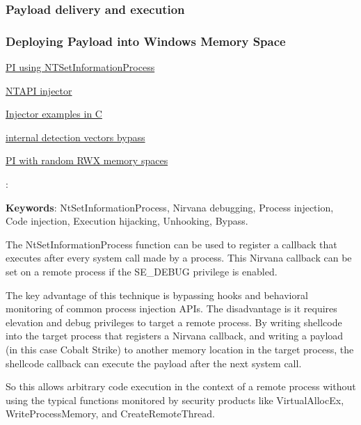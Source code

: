 \documentclass{article}
\newcommand{\outlinecite}[1]{\citetitle{#1} \textcite{#1}}
\begin{document}
\subsubsection{Payload delivery and execution}

\subsubsection{Deploying Payload into Windows Memory Space}

\outlinecite{Zhan:2018}

\href{https://www.riskinsight-wavestone.com/en/2023/10/process-injection-using-ntsetinformationprocess/}{PI using NTSetInformationProcess}

\href{https://github.com/elddy/Windows-NTAPI-Injector}{NTAPI injector} 

\href{https://gist.github.com/WKL-Sec/96e17188e4c159c2cdf7ff2c111130cc#file-local-c}{Injector examples in C}

\href{https://www.unknowncheats.me/forum/anti-cheat-bypass/286274-internal-detection-vectors-bypass.html}{internal detection vectors bypass}

\href{https://medium.com/@s12deff/process-injection-with-random-rwx-memory-spaces-3e3651149527}{PI with random RWX memory spaces}


\textbf{}: \autocite{Dequeker:2023}

\textbf{Keywords}: NtSetInformationProcess, Nirvana debugging, Process injection, Code injection, Execution hijacking, Unhooking, Bypass.

The NtSetInformationProcess function can be used to register a callback that executes after every system call made by a process. This Nirvana callback can be set on a remote process if the SE\_DEBUG privilege is enabled.

The key advantage of this technique is bypassing hooks and behavioral monitoring of common process injection APIs. The disadvantage is it requires elevation and debug privileges to target a remote process.
By writing shellcode into the target process that registers a Nirvana callback, and writing a payload (in this case Cobalt Strike) to another memory location in the target process, the shellcode callback can execute the payload after the next system call.

So this allows arbitrary code execution in the context of a remote process without using the typical functions monitored by security products like VirtualAllocEx, WriteProcessMemory, and CreateRemoteThread.
\end{document}
